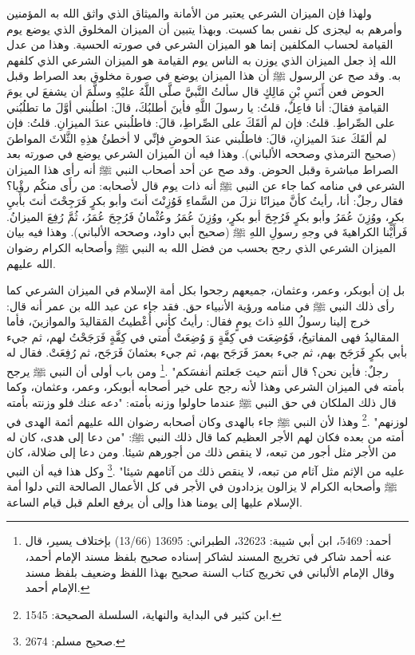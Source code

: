 ولهذا فإن الميزان الشرعي يعتبر من الأمانة والميثاق الذي واثق الله به المؤمنين وأمرهم به ليجزى كل نفس بما كسبت. وبهذا يتبين أن الميزان المخلوق الذي يوضع يوم القيامة لحساب المكلفين إنما هو الميزان الشرعي في صورته الحسية. وهذا من عدل الله إذ جعل الميزان الذي يوزن به الناس يوم القيامة هو الميزان الشرعي الذي كلفهم به. وقد صح عن الرسول ﷺ أن هذا الميزان يوضع في صورة مخلوق بعد الصراط وقبل الحوض فعن أَنَسِ بْنِ مَالِكٍ قال سألتُ النَّبيَّ صلَّى اللَّهُ عليْهِ وسلَّمَ أن يشفعَ لي يومَ القيامةِ فقالَ: أنا فاعِلٌ، قلتُ: يا رسولَ اللَّهِ فأينَ أطلبُكَ، قالَ: اطلُبني أوَّلَ ما تطلُبُني على الصِّراطِ. قلتُ: فإن لم ألقَكَ على الصِّراطِ، قالَ: فاطلُبني عندَ الميزانِ. قلتُ: فإن لم ألقَكَ عندَ الميزانِ، قالَ: فاطلُبني عندَ الحوضِ فإنِّي لا أخطئُ هذِهِ الثَّلاثَ المواطنَ {\footnotesize (صحيح الترمذي وصححه الألباني)}. وهذا فيه أن الميزان الشرعي يوضع في صورته بعد الصراط مباشرة وقبل الحوض. وقد صح عن أحد أصحاب النبي ﷺ أنه رأى هذا الميزان الشرعي في منامه كما جاء عن النبي ﷺ أنه ذات يوم قال لأصحابه: من رأَى منكُم رؤْيا؟ فقال رجلٌ: أنا، رأيتُ كأنَّ ميزانًا نزلَ من السَّماءِ فَوُزِنْتَ أنتَ وأبو بكرٍ فَرَجِحْتَ أنتَ بأبيِ بكرٍ، ووُزِنَ عُمَرُ وأبو بكرٍ فَرُجِحَ أبو بكرٍ، ووُزِنَ عُمَرُ وعُثْمانُ فَرُجِحَ عُمَرُ، ثُمَّ رُفِعَ الميزانُ. فَرأَيْنا الكراهيةَ في وجهِ رسولِ اللهِ ﷺ {\footnotesize (صحيح أبي داود، وصححه الألباني)}. وهذا فيه بيان الميزان الشرعي الذي رجح بحسب من فضل الله به النبي ﷺ وأصحابه الكرام رضوان الله عليهم. 

بل إن أبوبكر، وعمر، وعثمان، جميعهم رجحوا بكل أمة الإسلام في الميزان الشرعي كما رأى ذلك النبي ﷺ في منامه ورؤية الأنبياء حق. فقد جاء عن عبد الله بن عمر أنه قال: خرج إلينا رسولُ اللهِ ذاتَ يومٍ فقال: رأيتُ كأني أُعْطيتُ المَقاليدَ والموازينَ، فأما المقاليدُ فهى المفاتيحُ، فَوُضِعَت في كِفَّةٍ وَ وُضِعَتْ أُمتي في كِفَّةٍ فَرَجَحْتُ لهم، ثم جيء بأبي بكرٍ فَرَجَح بهم، ثم جيء بعمرَ فَرَجَح بهم، ثم جيء بعثمانَ فَرَجَح، ثم رُفِعَتْ. فقال له رجلٌ: فأين نحن؟ قال أنتم حيث جَعلتم أنفسَكم" \href{https://shamela.ws/book/12051/671#p2}{\faExternalLink} \href{https://shamela.ws/book/25794/4217#p1}{\faExternalLink} \cite{albani_Sahiha}.\footnote{أحمد: 5469، ابن أبي شيبة: 32623، الطبراني: 13695 (13/66) بإختلاف يسير، قال عنه أحمد شاكر في تخريج المسند لشاكر إسناده صحيح بلفظ مسند الإمام أحمد، وقال الإمام الألباني في تخريج كتاب السنة صحيح بهذا اللفظ وضعيف بلفظ مسند الإمام أحمد.} ومن باب أولى أن النبي ﷺ يرجح بأمته في الميزان الشرعي وهذا لأنه رجح على خير أصحابه أبوبكر، وعمر، وعثمان، وكما قال ذلك الملكان في حق النبي ﷺ عندما حاولوا وزنه بأمته: "دعه عنك فلو وزنته بأمته لوزنهم"  \href{https://shamela.ws/book/9442/2253#p18}{\faExternalLink} \cite{albani_Sahiha}.\footnote{ابن كثير في البداية والنهاية، السلسلة الصحيحة: 1545.} وهذا لأن النبي ﷺ جاء بالهدى وكان أصحابه رضوان الله عليهم أئمة الهدى في أمته من بعده فكان لهم الأجر العظيم كما قال ذلك النبي ﷺ: "من دعا إلى هدى، كان له من الأجر مثل أجور من تبعه، لا ينقص ذلك من أجورهم شيئا. ومن دعا إلى ضلالة، كان عليه من الإثم مثل آثام من تبعه، لا ينقص ذلك من آثامهم شيئا" \href{https://shamela.ws/book/1727/6739#p2}{\faExternalLink} \cite{bukhari}.\footnote{صحيح مسلم: 2674.} وكل هذا فيه أن النبي ﷺ وأصحابه الكرام لا يزالون يزدادون في الأجر في كل الأعمال الصالحة التي دلوا أمة الإسلام عليها إلى يومنا هذا وإلى أن يرفع العلم قبل قيام الساعة. 

